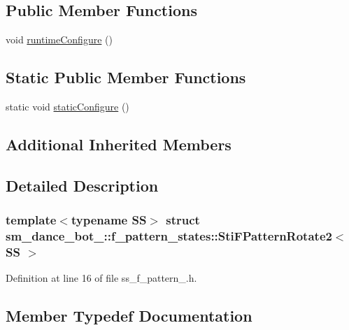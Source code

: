 \subsection*{Public Member Functions}
\begin{DoxyCompactItemize}
\item 
void \hyperlink{classsm__dance__bot__2_1_1f__pattern__states_1_1StiFPatternRotate2_ad1dd07b01ae400e7dff74f8143c71c5f}{runtime\+Configure} ()
\end{DoxyCompactItemize}
\subsection*{Static Public Member Functions}
\begin{DoxyCompactItemize}
\item 
static void \hyperlink{classsm__dance__bot__2_1_1f__pattern__states_1_1StiFPatternRotate2_a381589a659cc53cabd07a26ce82b3aab}{static\+Configure} ()
\end{DoxyCompactItemize}
\subsection*{Additional Inherited Members}


\subsection{Detailed Description}
\subsubsection*{template$<$typename SS$>$\newline
struct sm\+\_\+dance\+\_\+bot\+\_\+::f\+\_\+pattern\+\_\+states\+::\+Sti\+F\+Pattern\+Rotate2$<$ S\+S $>$}



Definition at line 16 of file ss\+\_\+f\+\_\+pattern\+\_.\+h.



\subsection{Member Typedef Documentation}
\mbox{\label{classsm__dance__bot__2_1_1f__pattern__states_1_1StiFPatternRotate2_abb26d0191d8a0a5bb83359bee5e9ca72}} 
